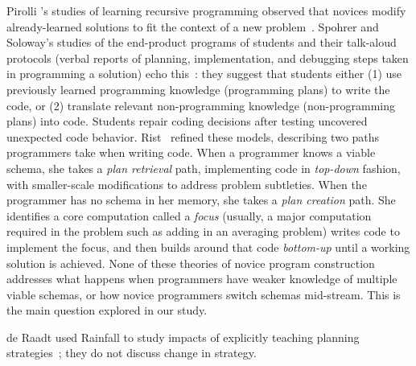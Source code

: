 Pirolli \etal's studies of learning recursive programming observed
that novices modify already-learned solutions to fit the context of a
new
problem~\cite{Pirolli_Anderson_1985,Pirolli_Anderson_Farrell_1984}. Spohrer
and Soloway's studies of the end-product
programs of students and their talk-aloud protocols (verbal reports of
planning, implementation, and debugging steps taken in programming a
solution) echo this~\cite{Spohrer_Soloway_1989}: they suggest that students either (1) use
previously learned programming knowledge (programming plans) to write
the code, or (2) translate relevant non-programming knowledge
(non-programming plans) into code.  Students repair coding decisions
after testing uncovered unexpected code behavior.
Rist~\cite{Rist_1989, Rist_1991} refined
these models, describing two paths programmers take when writing
code. When a programmer knows a viable schema, she takes a \emph{plan
  retrieval} path, implementing code in \emph{top-down} fashion, with
smaller-scale modifications to address problem subtleties. When the
programmer has no schema in her memory, she takes a \emph{plan
  creation} path. She identifies a core computation called a
\emph{focus} (usually, a major computation required in the problem
such as adding in an averaging problem) writes code to implement the
focus, and then builds around that code \emph{bottom-up} until a
working solution is achieved. None of these
theories of novice program construction addresses what happens when
programmers have weaker knowledge of multiple viable schemas, or how
novice programmers switch schemas mid-stream.  This is the main
question explored in our study.

de Raadt \etal used Rainfall to study impacts of explicitly teaching
planning strategies~\cite{deraadt-watson-toleman-strategies-ace09};
they do not discuss change in strategy. 


